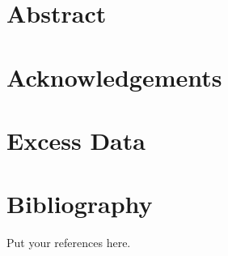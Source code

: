\documentclass[a4paper,11pt,twoside,onecolumn]{book}
\begin{document}
\chapter*{Abstract}
\lipsum[1-3]

\chapter*{Acknowledgements}
\lipsum[1-3]

\tableofcontents
\newpage



\mainmatter







%



\appendix

\chapter{Excess Data}
\lipsum[1-3]

\backmatter

\chapter*{Bibliography}
Put your references here.
\lipsum[1-5]
\end{document}
